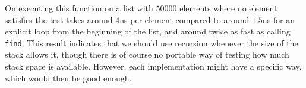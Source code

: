 On \sbcl{} executing this function on a list with $50000$ elements
where no element satisfies the test takes around $4$ns per element
compared to around $1.5$ns for an explicit loop from the beginning of
the list, and around twice as fast as calling \texttt{find}.%
  This result indicates that we should use
recursion whenever the size of the stack allows it, though there is of
course no portable way of testing how much stack space is available.
However, each implementation might have a specific way, which would
then be good enough.
